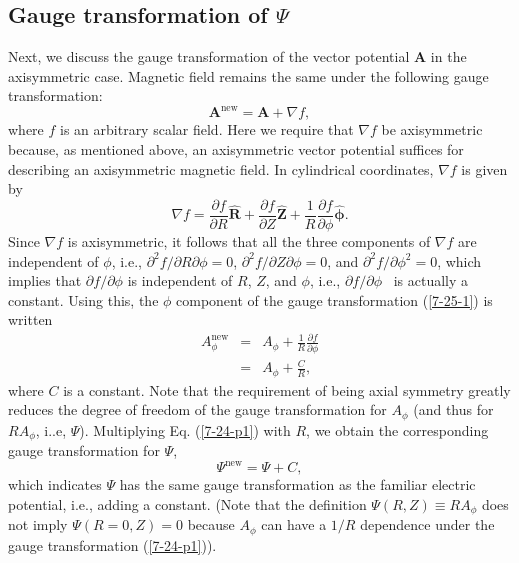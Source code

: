 \documentclass{article}
\newcommand{\tmmathbf}[1]{\ensuremath{\boldsymbol{#1}}}
\newcommand{\tmop}[1]{\ensuremath{\operatorname{#1}}}
\begin{document}
\subsection{Gauge transformation of $\Psi$}

Next, we discuss the gauge transformation of the vector potential $\mathbf{A}$
in the axisymmetric case. Magnetic field remains the same under the following
gauge transformation:
\begin{equation}
  \label{7-25-1} \mathbf{A}^{\tmop{new}} =\mathbf{A}+ \nabla f,
\end{equation}
where $f$ is an arbitrary scalar field. Here we require that $\nabla f$ be
axisymmetric because, as mentioned above, an axisymmetric vector potential
suffices for describing an axisymmetric magnetic field. In cylindrical
coordinates, $\nabla f$ is given by
\begin{equation}
  \nabla f = \frac{\partial f}{\partial R} \hat{\mathbf{R}} + \frac{\partial
  f}{\partial Z} \hat{\mathbf{Z}} + \frac{1}{R}  \frac{\partial f}{\partial
  \phi} \hat{\tmmathbf{\phi}} .
\end{equation}
Since $\nabla f$ is axisymmetric, it follows that all the three components of
$\nabla f$ are independent of $\phi$, i.e., $\partial^2 f / \partial R
\partial \phi = 0$, $\partial^2 f / \partial Z \partial \phi = 0$, and
$\partial^2 f / \partial \phi^2 = 0$, which implies that $\partial f /
\partial \phi$ is independent of $R$, $Z$, and $\phi$, i.e., $\partial f /
\partial \phi$ \ is actually a constant. Using this, the $\phi$ component of
the gauge transformation (\ref{7-25-1}) is written
\begin{eqnarray}
  A_{\phi}^{\tmop{new}} & = & A_{\phi} + \frac{1}{R}  \frac{\partial
  f}{\partial \phi} \nonumber\\
  & = & A_{\phi} + \frac{C}{R},  \label{7-24-p1}
\end{eqnarray}
where $C$ is a constant. Note that the requirement of being axial symmetry
greatly reduces the degree of freedom of the gauge transformation for
$A_{\phi}$ (and thus for $R A_{\phi}$, i..e, $\Psi$). Multiplying Eq.
(\ref{7-24-p1}) with $R$, we obtain the corresponding gauge transformation for
$\Psi$,
\begin{equation}
  \label{7-24-p3} \Psi^{\tmop{new}} = \Psi + C,
\end{equation}
which indicates $\Psi$ has the same gauge transformation as the familiar
electric potential, i.e., adding a constant. (Note that the definition $\Psi
(R, Z) \equiv R A_{\phi}$ does not imply $\Psi (R = 0, Z) = 0$ because
$A_{\phi}$ can have a $1 / R$ dependence under the gauge transformation
(\ref{7-24-p1})).
\end{document}
